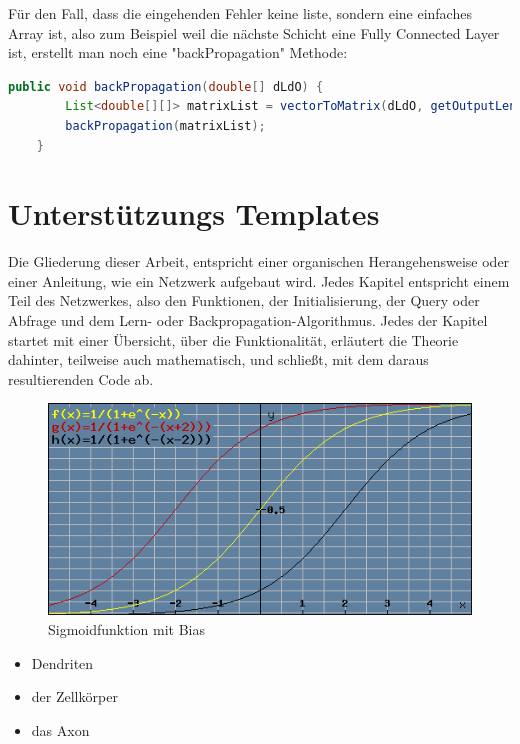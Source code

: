 \documentclass[12pt]{article}
\begin{document}
Für den Fall, dass die eingehenden Fehler keine liste, sondern eine einfaches Array ist, also zum Beispiel weil die nächste Schicht eine Fully Connected Layer ist, erstellt man noch eine "backPropagation" Methode:

\begin{lstlisting}[language=Java]
    public void backPropagation(double[] dLdO) {
        List<double[][]> matrixList = vectorToMatrix(dLdO, getOutputLength(), getOutputRows(), getOutputCols());
        backPropagation(matrixList);
    }
\end{lstlisting}

\cleardoublepage
\section{Unterstützungs Templates}
Die Gliederung dieser Arbeit, entspricht einer organischen Herangehensweise oder einer Anleitung, wie ein Netzwerk aufgebaut wird. Jedes Kapitel entspricht einem Teil des Netzwerkes, also den Funktionen, der Initialisierung, der Query oder Abfrage und dem Lern- oder Backpropagation-Algorithmus. Jedes der Kapitel startet mit einer Übersicht, über die Funktionalität, erläutert die Theorie dahinter, teilweise auch mathematisch, und schließt, mit dem daraus resultierenden Code ab. 


\begin{figure}[H]
\centering
\includegraphics[scale=0.60]{./Images/Pasted image 20231005145933.png}
\caption{Sigmoidfunktion mit Bias}
\label{Sigmoid-Funktion mit Bias}
\end{figure}


\begin{itemize}
  \item Dendriten
  \item der Zellkörper
  \item das Axon
\end{itemize}
\end{document}
